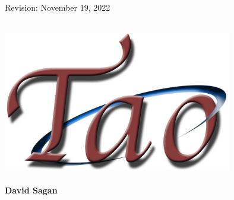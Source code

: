 \thispagestyle{empty}

\begin{flushright}
\large
Revision: November 19, 2022 \\
\end{flushright}

\vfill

{
\begin{center}
 \\
\vskip 0.2in
\includegraphics[width=10cm]{tao-logo.pdf} \\
\vskip 0.3in
 \\
\vskip 0.4in
{\huge \sf\bf David Sagan} \\
\end{center}
}

\vfill
\break
